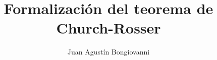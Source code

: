 \documentclass{book}
\begin{document}
\title{Formalización del teorema de Church-Rosser}
\author{Juan Agustín Bongiovanni}


\maketitle

\tableofcontents







\end{document}
